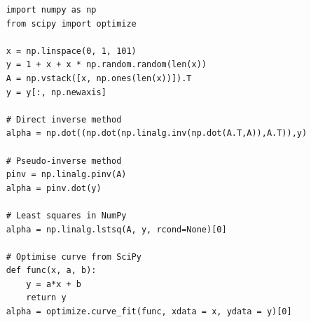 \documentclass{article}
\begin{document}
\begin{verbatim}
    import numpy as np
    from scipy import optimize
    
    x = np.linspace(0, 1, 101)
    y = 1 + x + x * np.random.random(len(x))
    A = np.vstack([x, np.ones(len(x))]).T
    y = y[:, np.newaxis]

    # Direct inverse method
    alpha = np.dot((np.dot(np.linalg.inv(np.dot(A.T,A)),A.T)),y)

    # Pseudo-inverse method
    pinv = np.linalg.pinv(A)
    alpha = pinv.dot(y)

    # Least squares in NumPy
    alpha = np.linalg.lstsq(A, y, rcond=None)[0]

    # Optimise curve from SciPy
    def func(x, a, b):
        y = a*x + b
        return y
    alpha = optimize.curve_fit(func, xdata = x, ydata = y)[0]
\end{verbatim}
\end{document}
